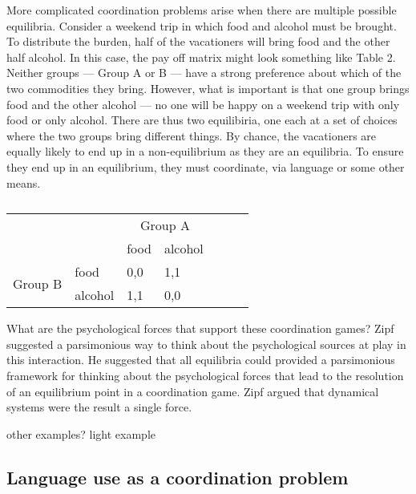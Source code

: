 \documentclass[man, noapacite, 12pt]{apa2}
\begin{document}
More complicated coordination problems arise when there are multiple possible equilibria. Consider a weekend trip in which food and alcohol must be brought. To distribute the burden, half of the vacationers will bring food and the other half alcohol. In this case, the pay off matrix might look something like Table 2. Neither groups --- Group A or B --- have a strong preference about which of the two commodities they bring. However, what is important is that one group brings food and the other alcohol --- no one will be happy on a weekend trip with only food or only alcohol. There are thus two equilibiria, one each at a  set of choices where the two groups bring different things. By chance, the vacationers are equally likely to end up in a non-equilibrium as they are an equilibria. To ensure they end up in an equilibrium, they must coordinate, via language or some other means.

\begin{table}[t]
\begin{center}
\begin{tabular}{l p{3cm} l p{3cm} l p{3cm} l}
 &  & \multicolumn{2}{c}{Group A} \\ \cline{2-4} 
\multicolumn{1}{l|}{} & \multicolumn{1}{l|}{} & \multicolumn{1}{l|}{food} & \multicolumn{1}{l|}{alcohol} \\ \cline{2-4} 
\multicolumn{1}{c|}{\multirow{2}{*}{Group B}} & \multicolumn{1}{l|}{food} & \multicolumn{1}{l|}{0,0} & \multicolumn{1}{l|}{1,1} \\ \cline{2-4} 
\multicolumn{1}{c|}{} & \multicolumn{1}{l|}{alcohol} & \multicolumn{1}{l|}{1,1} & \multicolumn{1}{l|}{0,0} \\ \cline{2-4} 
\end{tabular}
\caption{}
\end{center}
\end{table}

What are the psychological forces that support these coordination games?
Zipf suggested a parsimonious way to think about the psychological sources at play in this interaction. He suggested that all equilibria could provided a parsimonious framework for thinking about the psychological forces that lead to the resolution of an equilibrium point in a coordination game. Zipf argued that dynamical systems were the result a single force.

other examples?  light example

\subsection{Language use as a coordination problem}
\end{document}
